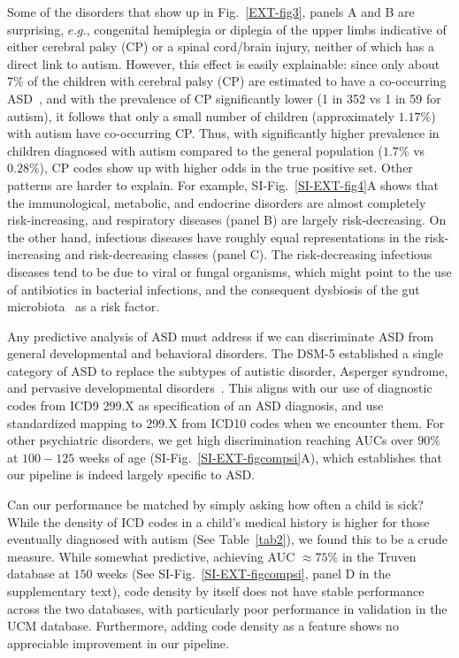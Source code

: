 \documentclass[onecolumn,10pt]{IEEEtran}
\begin{document}
Some of the disorders that show up in Fig.~\ref{EXT-fig3}, panels A and B are  surprising, $e.g.$,  congenital hemiplegia or diplegia of the upper limbs indicative of either  cerebral palsy (CP) or a spinal cord/brain injury, neither of which has a direct  link to autism. However, this effect is easily explainable: since only about $7\%$ of the children with  cerebral palsy (CP) are estimated to have a  co-occurring ASD~\cite{cdccp,christensen2014prevalence}, and with the prevalence of CP  significantly lower  (1 in 352 vs 1 in 59 for autism), it follows that  only a small number of children (approximately $1.17\%$) with autism have co-occurring CP. Thus, with significantly higher prevalence in children diagnosed with autism compared to the general population ($1.7\%$ vs $0.28\%$), CP codes show  up with higher odds in the true positive set. Other patterns are harder to explain. For example,  SI-Fig.~\ref{SI-EXT-fig4}A shows that the immunological, metabolic, and endocrine disorders are almost completely risk-increasing, and respiratory diseases (panel B) are largely risk-decreasing. On the other hand, infectious diseases have roughly equal representations in the risk-increasing and risk-decreasing classes (panel C). The risk-decreasing infectious diseases tend to be due to viral or fungal organisms, which might point to the use of antibiotics in bacterial infections, and the consequent dysbiosis of the gut microbiota~\cite{pmid30823414,pmid27957319} as a risk factor.

Any predictive analysis of ASD must address if we can
discriminate  ASD from  general developmental and behavioral disorders.
The DSM-5 established a single category of ASD to replace
the subtypes of autistic disorder, Asperger syndrome, and pervasive developmental disorders~\cite{hyman2020identification}. This aligns with our use of diagnostic codes from ICD9 299.X as specification of an ASD diagnosis, and use standardized mapping to 299.X from ICD10 codes when we encounter them. For other psychiatric disorders, we get  high discrimination reaching AUCs over $90\%$ at $100 -125$ weeks of age (SI-Fig.~\ref{SI-EXT-figcompsi}A), which establishes that our pipeline is indeed largely specific to ASD.

Can our performance be matched by simply asking how often a child is sick? While  the  density of ICD codes in a child's medical history is higher for those eventually diagnosed with autism (See Table~\ref{tab2}), we found this to be a crude measure. While somewhat predictive,  achieving AUC  $\approx 75\%$ in the Truven database at $150$ weeks (See SI-Fig.~\ref{SI-EXT-figcompsi}, panel D in the supplementary text), code density by itself does not have stable  performance across the two databases, with particularly poor performance in validation in the UCM database. Furthermore, adding code density as a  feature shows  no appreciable  improvement in our pipeline.
\end{document}
